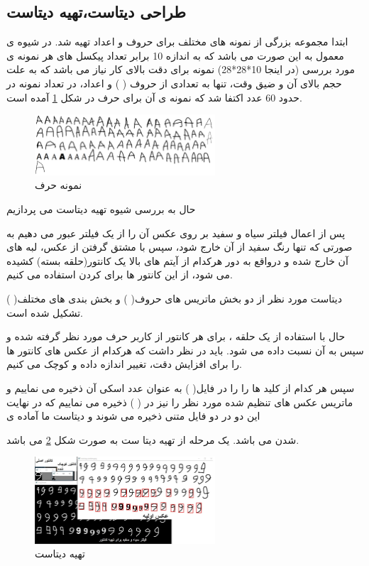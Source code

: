 \documentclass[oneside]{article}
\begin{document}
\subsection{طراحی دیتاست،تهیه دیتاست}
ابتدا مجموعه بزرگی از نمونه های مختلف برای حروف و اعداد تهیه شد. در شیوه ی معمول به این صورت می باشد که به اندازه 10 برابر تعداد پیکسل های هر نمونه ی مورد بررسی (در اینجا 10*28*28) نمونه برای دقت بالای کار نیاز می باشد که به علت حجم بالای آن و  ضیق وقت، تنها به تعدادی از حروف (
) و اعداد، در تعداد نمونه در حدود 60 عدد اکتفا شد که نمونه ی آن برای حرف
در شکل 
\ref{A}
آمده است.
\begin{figure}
\centering
\includegraphics[width=0.6\textwidth]{Pictures/6.png}
\caption{نمونه حرف
}
\label{A}
\end{figure}

حال به بررسی شیوه تهیه دیتاست می پردازیم

پس از اعمال فیلتر سیاه و سفید بر روی عکس آن را از یک فیلتر عبور می دهیم به صورتی که تنها رنگ سفید از آن خارج شود، سپس با مشتق گرفتن از عکس، لبه های آن خارج شده و درواقع به دور هرکدام از آیتم های بالا یک کانتور(حلقه بسته) کشیده می شود، از این کانتور ها برای
کردن استفاده می کنیم.

دیتاست مورد نظر از دو بخش ماتریس های حروف(
) و بخش بندی های مختلف(
) تشکیل شده است.

حال با استفاده از یک حلقه ، برای هر کانتور از کاربر حرف مورد نظر گرفته شده و سپس به آن نسبت داده می شود. باید در نظر داشت که هرکدام از عکس های کانتور ها را برای افزایش دقت، تغییر اندازه داده و کوچک می کنیم.

سپس هر کدام از کلید ها را را در فایل(
) به عنوان عدد اسکی آن ذخیره می نماییم و ماتریس عکس های تنظیم شده مورد نظر را نیز در (
) ذخیره می نماییم که در نهایت این دو در دو فایل متنی ذخیره می شوند و دیتاست ما آماده ی 

شدن می باشد. یک مرحله از تهیه دیتا ست به صورت شکل 
\ref{dataset}
 می باشد.
\begin{figure}
\centering
\includegraphics[width=0.6\textwidth]{Pictures/7.jpg}
\caption{تهیه دیتاست}
\label{dataset}
\end{figure}
\end{document}
